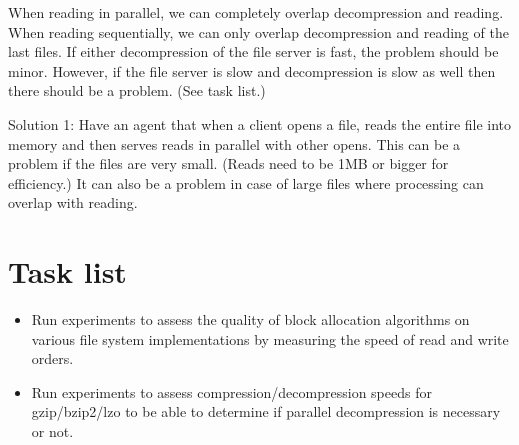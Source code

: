 \documentclass{article}
\begin{document}
When reading in parallel, we can completely overlap decompression and 
reading. When reading sequentially, we can only overlap decompression and
reading of the last files. If either decompression of the file server is fast,
the problem should be minor. However, if the file server is slow and
decompression is slow as well then there should be a problem. (See task list.)

Solution 1: Have an agent that when a client opens a file, reads the entire file
into memory and then serves reads in parallel with other opens. This can be a
problem if the files are very small. (Reads need to be 1MB or bigger for efficiency.)
It can also be a problem in case of large files where processing can overlap with
reading.

\section{Task list}

\begin{itemize}
\item Run experiments to assess the quality of block allocation algorithms on various
file system implementations by measuring the speed of read and write orders.
\item Run experiments to assess compression/decompression speeds for gzip/bzip2/lzo
to be able to determine if parallel decompression is necessary or not.
\end{itemize}
\end{document}
